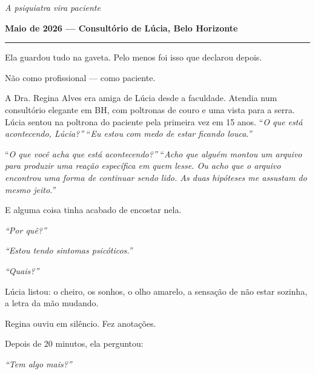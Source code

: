 
\noindent \textit{A psiquiatra vira paciente}

\noindent \textbf{Maio de 2026 --- Consultório de Lúcia, Belo Horizonte}

\vspace{0.5em}\noindent\rule{\textwidth}{0.5pt}\vspace{0.5em}

\noindent Ela guardou tudo na gaveta.
\noindent Pelo menos foi isso que declarou depois.

\noindent Não como profissional --- como paciente.

\noindent A Dra. Regina Alves era amiga de Lúcia desde a faculdade. Atendia num consultório elegante em BH, com poltronas de couro e uma vista para a serra. Lúcia sentou na poltrona do paciente pela primeira vez em 15 anos.
\noindent \textquotedblleft{\textit{O que está acontecendo, Lúcia?\textquotedblright{}}}
\noindent \textquotedblleft{\textit{Eu estou com medo de estar ficando louca.\textquotedblright{}}}

\noindent \textquotedblleft{\textit{O que você acha que está acontecendo?\textquotedblright{}}}
\noindent \textquotedblleft{\textit{Acho que alguém montou um arquivo para produzir uma reação específica em quem lesse. Ou acho que o arquivo encontrou uma forma de continuar sendo lido. As duas hipóteses me assustam do mesmo jeito.\textquotedblright{}}}

\noindent E alguma coisa tinha acabado de encostar nela.

\noindent \textit{\textquotedblleft{}Por quê?\textquotedblright{}}

\noindent \textit{\textquotedblleft{}Estou tendo sintomas psicóticos.\textquotedblright{}}

\noindent \textit{\textquotedblleft{}Quais?\textquotedblright{}}

\noindent Lúcia listou: o cheiro, os sonhos, o olho amarelo, a sensação de não estar sozinha, a letra da mão mudando.

\noindent Regina ouviu em silêncio. Fez anotações.

\noindent Depois de 20 minutos, ela perguntou:

\noindent \textit{\textquotedblleft{}Tem algo mais?\textquotedblright{}}

